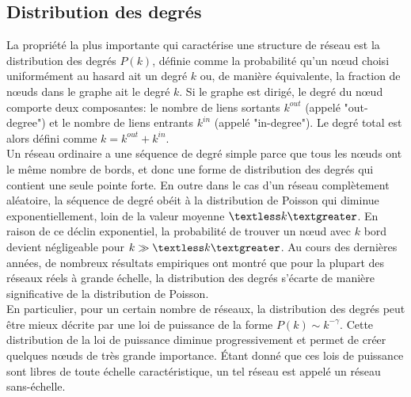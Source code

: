 \subsection{Distribution des degrés}
La propriété la plus importante qui caractérise une structure de réseau est la distribution des degrés $P(k)$,
définie comme la probabilité qu'un nœud choisi uniformément au hasard ait un degré $k$ ou, de manière équivalente, la
fraction de nœuds dans le graphe ait le degré $k$.
Si le graphe est dirigé, le degré du nœud comporte deux composantes: le nombre de liens sortants $k^{out}$ (appelé
"out-degree") et le nombre de liens entrants $k^{in}$ (appelé "in-degree"). Le degré total est alors défini comme 
$k=k^{out}+k^{in}$.\\

Un réseau ordinaire a une séquence de degré simple parce que tous les nœuds ont le même nombre de bords, et donc une forme de distribution des degrés qui contient une seule pointe forte. En outre dans le cas d'un réseau complètement aléatoire, 
la séquence de degré obéit à la distribution de Poisson qui diminue exponentiellement, loin de la valeur moyenne $\textless k\textgreater$. En raison de ce déclin exponentiel, la probabilité de trouver un nœud avec $k$ bord devient négligeable pour  $k\gg \textless k\textgreater$.
Au cours des dernières années, de nombreux résultats empiriques ont montré que pour la plupart des réseaux réels à grande échelle, la distribution des degrés s'écarte de manière significative de la distribution de Poisson.\\
En particulier, pour un certain nombre de réseaux, la distribution des degrés peut être mieux décrite par une loi de puissance de la forme $P(k)\sim k^{-\gamma}$. Cette distribution de la loi de puissance diminue progressivement et permet de créer quelques nœuds de très grande importance. Étant donné que ces lois de puissance sont libres de toute échelle caractéristique, un tel réseau est appelé un réseau sans-échelle.


